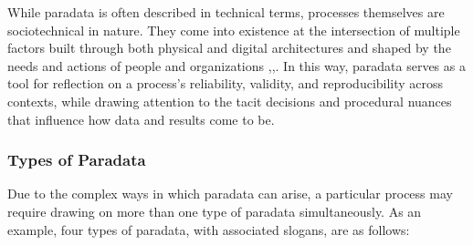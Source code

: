 While paradata is often described in technical terms, processes themselves are sociotechnical in nature. They come into existence at the intersection of multiple factors built through both physical and digital architectures and shaped by the needs and actions of people and organizations \cite{bowker_sorting_2000},\cite{dourish_stuff_2022},\cite{hine_databases_2006}. In this way, paradata serves as a tool for reflection on a process's reliability, validity, and reproducibility across contexts, while drawing attention to the tacit decisions and procedural nuances that influence how data and results come to be.


\subsubsection{Types of Paradata}

Due to the complex ways in which paradata can arise, a particular process may require drawing on more than one type of paradata simultaneously. \cite{huvila_perspectives_2024}
As an example, four types of paradata, with associated slogans, are as follows:


